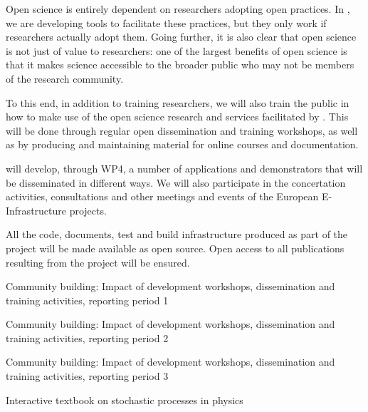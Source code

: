 \begin{workpackage}
\begin{wpdescription}

Open science is entirely dependent on researchers adopting open practices.
In \TheProject, we are developing tools to facilitate these practices,
but they only work if researchers actually adopt them.
Going further, it is also clear that open science is not just of value
to researchers: one of the largest benefits of open science is that it makes
science accessible to the broader public who may not be members of the
research community.

To this end, in addition to training researchers, we will also train the public in how to
make use of the open science research and services facilitated by \TheProject.
This will be done through regular open dissemination and training workshops, as well as
by producing and maintaining material for online courses and documentation.

\TheProject will develop, through WP4, a number of applications and demonstrators that
will be disseminated in different ways.
We will also participate in the concertation activities,
consultations and other meetings and events of the European
E-Infrastructure projects.

All the code, documents, test and build infrastructure produced as
part of the project will be made available as open source.
Open access to all publications resulting from the project will be ensured.


\end{wpdescription}

\begin{tasklist}




\end{tasklist}


\begin{wpdelivs}
\begin{wpdeliv}[due=18,id=report1,dissem=PU,miles=prototype,nature=R,lead=INSERM]
  {Community building: Impact of development workshops, dissemination and training activities, reporting period 1}
\end{wpdeliv}
\begin{wpdeliv}[due=36,id=report2,dissem=PU,miles=community,nature=R,lead=INSERM]
  {Community building: Impact of development workshops, dissemination and training activities, reporting period 2}
\end{wpdeliv}
\begin{wpdeliv}[due=48,id=report3,dissem=PU,miles=final,nature=R,lead=INSERM]
  {Community building: Impact of development workshops, dissemination and training activities, reporting period 3}
\end{wpdeliv}
\begin{wpdeliv}[due=48,id=sde-book,dissem=PU,miles=final,nature=DEM,lead=SIL]
  {Interactive textbook on stochastic processes in physics}
\end{wpdeliv}

\end{wpdelivs}

\end{workpackage}

